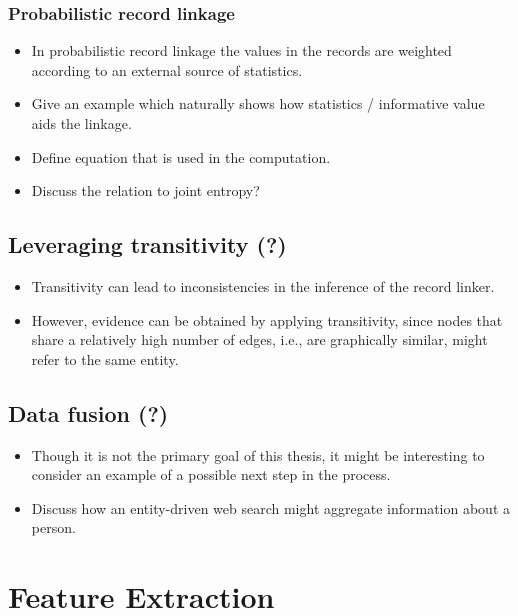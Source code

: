 \documentclass[paper=a4, fontsize=11pt]{scrartcl}
\begin{document}
\subsubsection{Probabilistic record linkage}
\begin{itemize}
    \item In probabilistic record linkage the values in the records are weighted according to an external source of statistics.
    \item Give an example which naturally shows how statistics / informative value aids the linkage.
    \item Define equation that is used in the computation.
    \item Discuss the relation to joint entropy?
\end{itemize}

\subsection{Leveraging transitivity (?)}
\begin{itemize}
    \item Transitivity can lead to inconsistencies in the inference of the record linker.
    \item However, evidence can be obtained by applying transitivity, since nodes that share a relatively high number of edges, i.e., are graphically similar, might refer to the same entity.
\end{itemize}

\subsection{Data fusion (?)}
\begin{itemize}
    \item Though it is not the primary goal of this thesis, it might be interesting to consider an example of a possible next step in the process.
    \item Discuss how an entity-driven web search might aggregate information about a person.
\end{itemize}




\section{Feature Extraction}

\end{document}
